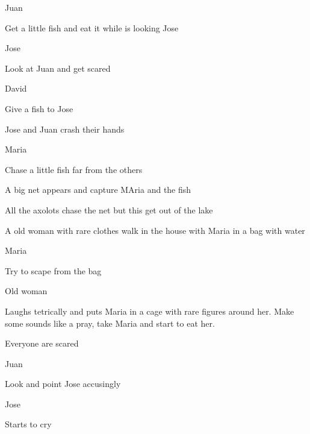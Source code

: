 \documentclass{screenplay}[2012/06/30]
\begin{document}
\begin{dialogue}[serious]{Juan}
\end{dialogue}

Get a little fish and eat it while is looking Jose

\begin{dialogue}[scared]{Jose}
\end{dialogue}

Look at Juan and get scared

\begin{dialogue}[shy]{David}
\end{dialogue}

Give a fish to Jose 

Jose and Juan crash their hands

\begin{dialogue}{Maria}
\end{dialogue}

Chase a little fish far from the others

A big net appears and capture MAria and the fish

All the axolots chase the net but this get out of the lake
\fadeout
\fadein
{}

A old woman with rare clothes walk in the house with Maria in a bag with water

\begin{dialogue}[scared]{Maria}
\end{dialogue}

Try to scape from the bag

\begin{dialogue}[smiled]{Old woman}
\end{dialogue}

Laughs tetrically and puts Maria in a cage with rare figures around her.
Make some sounds like a pray, take Maria and start to eat her.

\fadeout
\fadein


Everyone are scared

\begin{dialogue}[angry]{Juan}
\end{dialogue}

Look and point Jose accusingly

\begin{dialogue}[scared]{Jose}
\end{dialogue}

Starts to cry
\end{document}
